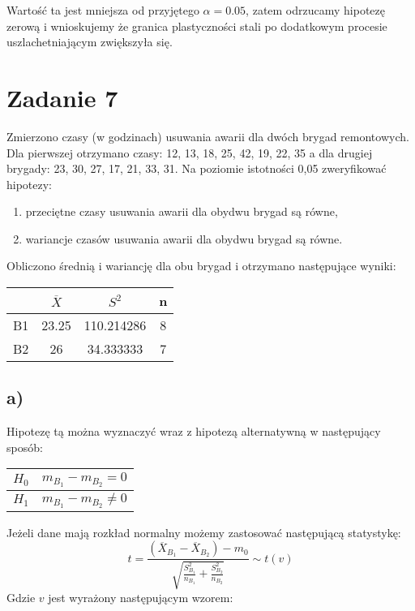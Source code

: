\documentclass{article}
\begin{document}
Wartość ta jest mniejsza od przyjętego $\alpha = 0.05$, zatem odrzucamy hipotezę zerową i wnioskujemy że granica plastyczności stali po dodatkowym procesie uszlachetniającym zwiększyła się.

\newpage
\section{Zadanie 7}
Zmierzono czasy (w godzinach) usuwania awarii dla dwóch brygad remontowych. Dla pierwszej otrzymano czasy: 12, 13, 18, 25, 42, 19, 22, 35 a dla drugiej brygady: 23, 30, 27, 17, 21, 33, 31.
Na poziomie istotności 0,05 zweryfikować hipotezy:
\begin{enumerate}[label = \alph*)]
\item przeciętne czasy usuwania awarii dla obydwu brygad są równe,
\item wariancje czasów usuwania awarii dla obydwu brygad są równe.
\end{enumerate}

Obliczono średnią i wariancję dla obu brygad i otrzymano następujące wyniki:
\begin{center} \begin{tabular}{|c|c|c|c|} \hline
 & $\overline{X}$ & $S^2$ & n \\ \hline
B1 & 23.25 & 110.214286 & 8\\ \hline
B2 & 26 & 34.333333 & 7\\ \hline
\end{tabular} \end{center}

\subsection{a)}
Hipotezę tą można wyznaczyć wraz z hipotezą alternatywną w następujący sposób:
\begin{center} \begin{tabular}{|c|c|} \hline
$H_0$ & $m_{B_1} - m_{B_2} = 0$ \\ \hline
$H_1$ & $m_{B_1} - m_{B_2} \neq 0$ \\ \hline
\end{tabular} \end{center}

Jeżeli dane mają rozkład normalny możemy zastosować następującą statystykę:
\[ t = \frac{(\overline{X}_{B_1} - \overline{X}_{B_2}) - m_0}{\sqrt{ \frac{S_{B_1}^2}{n_{B_1}} + \frac{S_{B_2}^2}{n_{B_2}} }} \sim t(v) \]
Gdzie $v$ jest wyrażony następującym wzorem:
\end{document}
